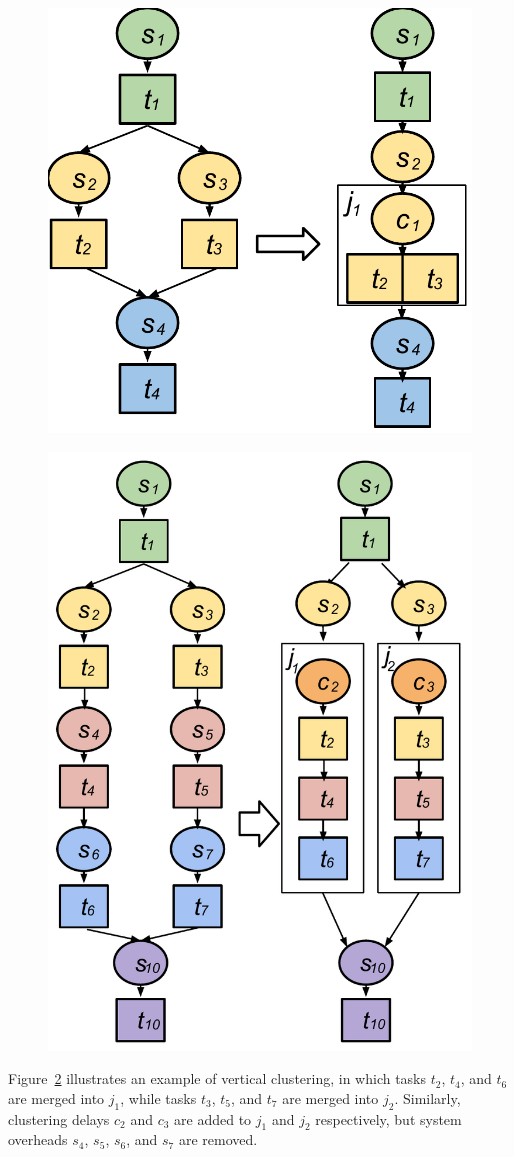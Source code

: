 \documentclass{IOS-Book-Article}
\begin{document}
\begin{figure}[!htb]
\centering
 \includegraphics[width=0.45\linewidth]{hc.pdf}
  \label{fig:model_hc}
\end{figure}

\begin{figure}[!htb]
\centering
 \includegraphics[width=0.5\linewidth]{vc.pdf}
  \label{fig:model_vc}
\end{figure}

Figure~\ref{fig:model_vc} illustrates an example of vertical clustering, in which tasks $t_2$, $t_4$, and $t_6$ are merged into $j_1$, while tasks $t_3$, $t_5$, and $t_7$ are merged into $j_2$. Similarly, clustering delays $c_2$ and $c_3$ are added to $j_1$ and $j_2$ respectively, but system overheads $s_4$, $s_5$, $s_6$, and $s_7$ are removed. 
\end{document}
